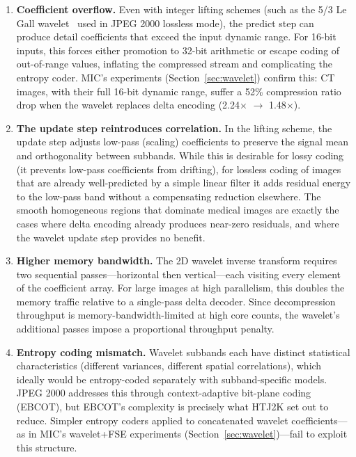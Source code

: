 \documentclass[11pt,twocolumn]{article}
\begin{document}
\begin{enumerate}[nosep]
    \item \textbf{Coefficient overflow.}
    Even with integer lifting schemes (such as the 5/3 Le Gall wavelet~\cite{legall1988} used in JPEG 2000 lossless mode), the predict step can produce detail coefficients that exceed the input dynamic range.
    For 16-bit inputs, this forces either promotion to 32-bit arithmetic or escape coding of out-of-range values, inflating the compressed stream and complicating the entropy coder.
    MIC's experiments (Section~\ref{sec:wavelet}) confirm this: CT images, with their full 16-bit dynamic range, suffer a 52\% compression ratio drop when the wavelet replaces delta encoding (2.24$\times$ $\to$ 1.48$\times$).

    \item \textbf{The update step reintroduces correlation.}
    In the lifting scheme, the update step adjusts low-pass (scaling) coefficients to preserve the signal mean and orthogonality between subbands.
    While this is desirable for lossy coding (it prevents low-pass coefficients from drifting), for lossless coding of images that are already well-predicted by a simple linear filter it adds residual energy to the low-pass band without a compensating reduction elsewhere.
    The smooth homogeneous regions that dominate medical images are exactly the cases where delta encoding already produces near-zero residuals, and where the wavelet update step provides no benefit.

    \item \textbf{Higher memory bandwidth.}
    The 2D wavelet inverse transform requires two sequential passes---horizontal then vertical---each visiting every element of the coefficient array.
    For large images at high parallelism, this doubles the memory traffic relative to a single-pass delta decoder.
    Since decompression throughput is memory-bandwidth-limited at high core counts, the wavelet's additional passes impose a proportional throughput penalty.

    \item \textbf{Entropy coding mismatch.}
    Wavelet subbands each have distinct statistical characteristics (different variances, different spatial correlations), which ideally would be entropy-coded separately with subband-specific models.
    JPEG 2000 addresses this through context-adaptive bit-plane coding (EBCOT), but EBCOT's complexity is precisely what HTJ2K set out to reduce.
    Simpler entropy coders applied to concatenated wavelet coefficients---as in MIC's wavelet+FSE experiments (Section~\ref{sec:wavelet})---fail to exploit this structure.
\end{enumerate}
\end{document}
